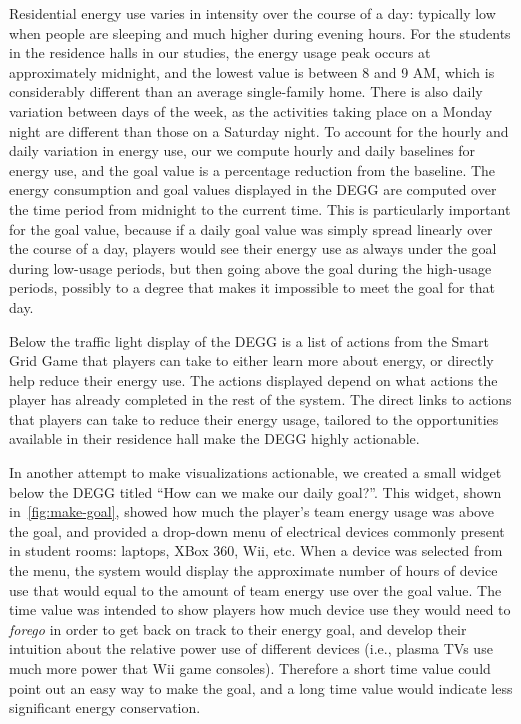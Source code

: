 \documentclass{sigchi}
\begin{document}
Residential energy use varies in intensity over the course of a day: typically low when people are sleeping and much higher during evening hours. For the students in the residence halls in our studies, the energy usage peak occurs at approximately midnight, and the lowest value is between 8 and 9 AM, which is considerably different than an average single-family home. There is also daily variation between days of the week, as the activities taking place on a Monday night are different than those on a Saturday night. To account for the hourly and daily variation in energy use, our we compute hourly and daily baselines for energy use, and the goal value is a percentage reduction from the baseline. The energy consumption and goal values displayed in the DEGG are computed over the time period from midnight to the current time. This is particularly important for the goal value, because if a daily goal value was simply spread linearly over the course of a day, players would see their energy use as always under the goal during low-usage periods, but then going above the goal during the high-usage periods, possibly to a degree that makes it impossible to meet the goal for that day.

Below the traffic light display of the DEGG is a list of actions from the Smart Grid Game that players can take to either learn more about energy, or directly help reduce their energy use. The actions displayed depend on what actions the player has already completed in the rest of the system. The direct links to actions that players can take to reduce their energy usage, tailored to the opportunities available in their residence hall make the DEGG highly actionable.

In another attempt to make visualizations actionable, we created a small widget below the DEGG titled ``How can we make our daily goal?''. This widget, shown in~\autoref{fig:make-goal}, showed how much the player's team energy usage was above the goal, and provided a drop-down menu of electrical devices commonly present in student rooms: laptops, XBox 360, Wii, etc. When a device was selected from the menu, the system would display the approximate number of hours of device use that would equal to the amount of team energy use over the goal value. The time value was intended to show players how much device use they would need to \emph{forego} in order to get back on track to their energy goal, and develop their intuition about the relative power use of different devices (i.e., plasma TVs use much more power that Wii game consoles). Therefore a short time value could point out an easy way to make the goal, and a long time value would indicate less significant energy conservation.
\end{document}
